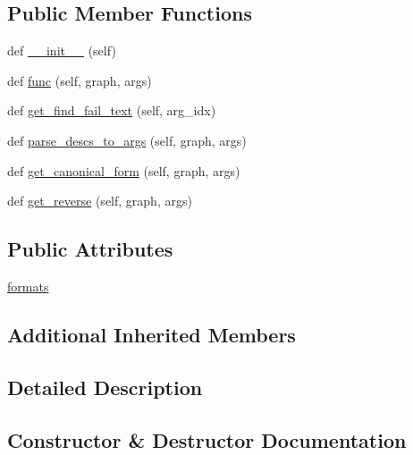 \subsection*{Public Member Functions}
\begin{DoxyCompactItemize}
\item 
def \hyperlink{classlight__chats_1_1graph_1_1GetObjectFunction_a77ef8fd9dd23fae23a1cb61fb0ebeca1}{\+\_\+\+\_\+init\+\_\+\+\_\+} (self)
\item 
def \hyperlink{classlight__chats_1_1graph_1_1GetObjectFunction_a36f3c298e8ac89d67ae856306d42a22d}{func} (self, graph, args)
\item 
def \hyperlink{classlight__chats_1_1graph_1_1GetObjectFunction_a257db456e6c73645523f4ad9bd5ff918}{get\+\_\+find\+\_\+fail\+\_\+text} (self, arg\+\_\+idx)
\item 
def \hyperlink{classlight__chats_1_1graph_1_1GetObjectFunction_a2854af16c5150dcd6a39176fefc3d536}{parse\+\_\+descs\+\_\+to\+\_\+args} (self, graph, args)
\item 
def \hyperlink{classlight__chats_1_1graph_1_1GetObjectFunction_a95528a5a8694228805bad940519e6e0e}{get\+\_\+canonical\+\_\+form} (self, graph, args)
\item 
def \hyperlink{classlight__chats_1_1graph_1_1GetObjectFunction_abf058d18fba80c7d17fc0d3ce8edbc72}{get\+\_\+reverse} (self, graph, args)
\end{DoxyCompactItemize}
\subsection*{Public Attributes}
\begin{DoxyCompactItemize}
\item 
\hyperlink{classlight__chats_1_1graph_1_1GetObjectFunction_a726f8b3315bfedc530da445bb3e135e6}{formats}
\end{DoxyCompactItemize}
\subsection*{Additional Inherited Members}


\subsection{Detailed Description}
\begin{DoxyVerb}
\end{DoxyVerb}
 

\subsection{Constructor \& Destructor Documentation}
\mbox{\label{classlight__chats_1_1graph_1_1GetObjectFunction_a77ef8fd9dd23fae23a1cb61fb0ebeca1}} 
